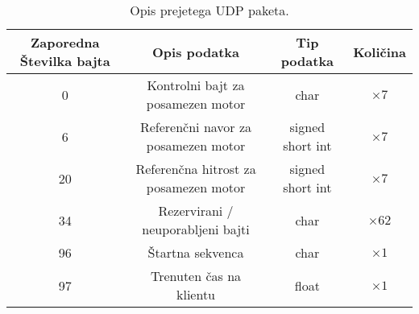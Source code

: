 
\begin{table}[h]
	\centering
	\begin{footnotesize}
		\begin{tabular}{|c c c c|}
		Zaporedna \v{S}tevilka bajta & Opis podatka & Tip podatka &  Koli\v{c}ina\\ \hline
		0 & Kontrolni bajt za posamezen motor & char & $\times 7$ \\
		6 & Referen\v{c}ni navor za posamezen motor & signed short int & $\times 7$ \\
		20 & Referen\v{c}na hitrost za posamezen motor & signed short int & $\times 7$ \\
		34 & Rezervirani / neuporabljeni bajti & char & $\times 62$ \\
		96 & \v{S}tartna sekvenca & char & $\times 1$\\
		97 & Trenuten \v{c}as na klientu & float & $\times 1$\\ \hline
		\end{tabular}
	\end{footnotesize}
	\caption{Opis prejetega UDP paketa.}
	\label{table:udp-command}
\end{table}